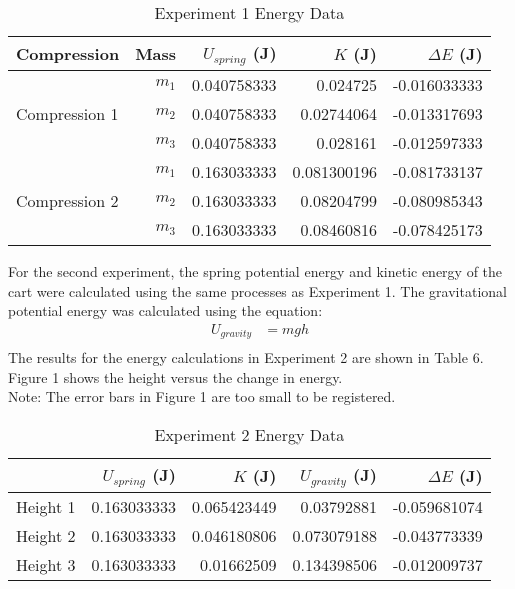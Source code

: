 \documentclass [12pt, letterpaper, twoside] {article}
\begin{document}
\begin {table}[h]
  \centering
  \begin {tabular} {| l | r | r | r | r |}
    \hline\hline
    Compression & Mass & \(U_{spring}\) (J) & \(K\) (J) & \(\Delta{E}\) (J) \\
    \hline
    \multirow{3}{*}{Compression 1} & \(m_{1}\) & 0.040758333 & 0.024725 & -0.016033333 \\
    & \(m_{2}\) & 0.040758333 & 0.02744064 & -0.013317693 \\
    & \(m_{3}\) & 0.040758333 & 0.028161 & -0.012597333 \\
    \hline
    \multirow{3}{*}{Compression 2} & \(m_{1}\) & 0.163033333 & 0.081300196 & -0.081733137 \\
    & \(m_{2}\) & 0.163033333 & 0.08204799 & -0.080985343 \\
    & \(m_{3}\) & 0.163033333 & 0.08460816 & -0.078425173 \\
    \hline\hline
  \end {tabular}
  \caption {Experiment 1 Energy Data}
\end {table}
     
\noindent
For the second experiment, the spring potential energy and kinetic energy of the cart were calculated using the same processes as Experiment 1. The gravitational potential energy was calculated using the equation:
\begin {equation*}
  \begin {split}
    U_{gravity} & = mgh \\
  \end {split}
\end {equation*}
The results for the energy calculations in Experiment 2 are shown in Table 6. Figure 1 shows the height versus the change in energy. \\

\noindent
Note: The error bars in Figure 1 are too small to be registered.

\begin {table}[h]
  \centering
  \begin {tabular} {| l | r | r | r | r |}
    \hline\hline
    & \(U_{spring}\) (J) & \(K\) (J) & \(U_{gravity}\) (J) & \(\Delta{E}\) (J) \\
    \hline
    Height 1 & 0.163033333 & 0.065423449 & 0.03792881 & -0.059681074 \\
    \hline
    Height 2 & 0.163033333 & 0.046180806 & 0.073079188 & -0.043773339 \\
    \hline
    Height 3 & 0.163033333 & 0.01662509 & 0.134398506 & -0.012009737 \\
    \hline\hline
  \end {tabular}
  \caption {Experiment 2 Energy Data}
\end {table}
\end{document}
